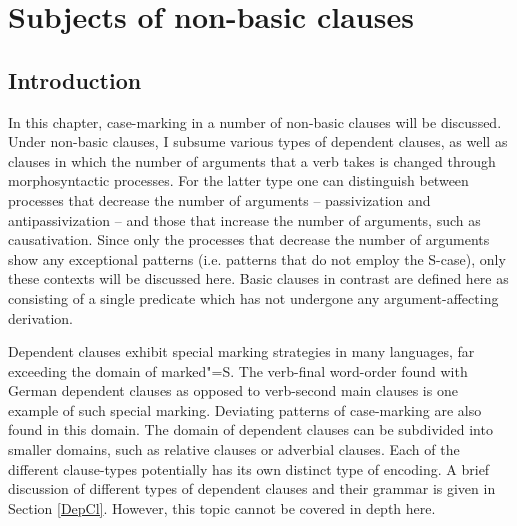 \chapter{Subjects of non-basic clauses}\label{nonbasic}


\section{Introduction} 

In this chapter, case-marking in a number of non-basic clauses will be discussed. 
Under non-basic clauses, I subsume various types of dependent clauses, as well as clauses in which the number of arguments that a verb takes is changed through morphosyntactic processes. 
For the latter type one can distinguish between processes that decrease the number of arguments -- passivization and antipassivization -- and those that increase the number of arguments, such as causativation. 
Since only the processes that decrease the number of arguments show any exceptional patterns (i.e. patterns that do not employ the S-case), only these contexts will be discussed here.
Basic clauses in contrast are defined here as consisting of a single predicate which has not undergone any argument-affecting derivation. 

Dependent clauses exhibit special marking strategies in many languages, far exceeding the domain of marked"=S. 
The verb-final word-order found with German dependent clauses as opposed to verb-second main clauses is one example of such special marking. 
Deviating patterns of case-marking are also found in this domain. 
The domain of dependent clauses can be subdivided into smaller domains, such as relative clauses or adverbial clauses. 
Each of the different clause-types potentially has its own distinct type of encoding. 
A brief discussion of different types of dependent clauses and their grammar is given in Section \ref{DepCl}. 
However, this topic cannot be covered in depth here.

